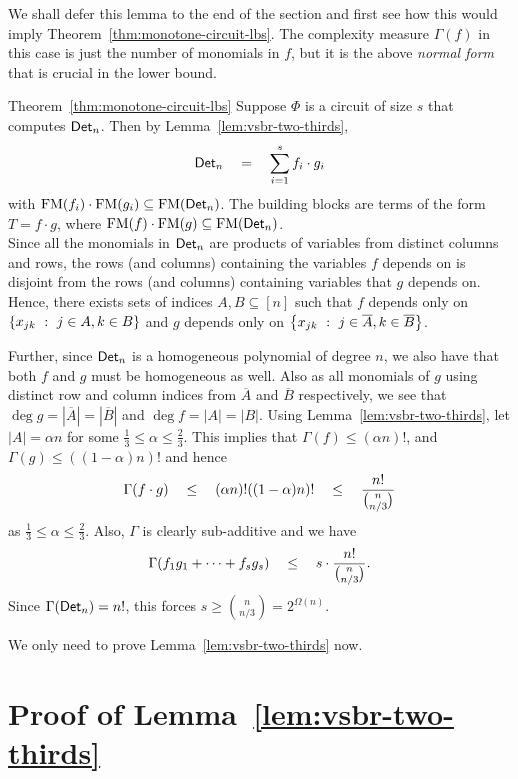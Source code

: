 \documentclass[12pt]{report}
\newcommand{\FM}{\mathrm{FM}}
\begin{document}
We shall defer this lemma to the end of the section and first see how
this would imply Theorem~\ref{thm:monotone-circuit-lbs}. The complexity measure $\Gamma(f)$ in this case is just the number of monomials in $f$, but it is the above \emph{normal form} that is crucial in the lower bound. 

\begin{proofof}{Theorem~\ref{thm:monotone-circuit-lbs}}
Suppose $\Phi$ is a circuit of size $s$ that computes $\mathsf{Det}_n$. Then by Lemma~\ref{lem:vsbr-two-thirds}, 
$$
\mathsf{Det}_n \quad=\quad \sum_{i=1}^s f_i \cdot g_i
$$
with $\FM(f_i)\cdot \FM(g_i) \subseteq \FM(\Det_n)$. The building blocks are terms of the form $T = f\cdot g$, where $\FM(f)  \cdot \FM(g) \subseteq \FM(\Det_n)$. \\

Since all the monomials in $\mathsf{Det}_n$ are products of variables from
distinct columns and rows, the rows (and columns) containing the
variables $f$ depends on is disjoint from the rows (and columns)
containing variables that $g$ depends on. Hence, there exists sets of indices $A,B
\subseteq [n]$ such that $f$ depends only on $\left\{{x_{jk}}\ : \ {j\in
  A, k\in B}\right\}$ and $g$ depends only on
$\left\{{x_{jk}}\ : \ {j\in\overline{A}, k\in
  \overline{B}}\right\}$.

Further, since $\mathsf{Det}_n$ is a homogeneous polynomial of degree $n$, we also have that both $f$ and $g$ must be homogeneous as well. Also as all monomials of $g$ using distinct row and column indices from $\overline{A}$ and $\overline{B}$ respectively, we see that $\deg g = |\overline{A}| = |\overline{B}|$ and $\deg f = |A| = |B|$. Using Lemma~\ref{lem:vsbr-two-thirds}, let $|A| = \alpha n$ for some $\frac{1}{3}\leq \alpha \leq \frac{2}{3}$. This implies that $\Gamma(f)\leq (\alpha n)!$, and $\Gamma(g)\leq ((1-\alpha)n)!$ and hence
$$\Gamma(f\cdot g) \quad \leq\quad (\alpha n)! ((1-\alpha)n)! \quad \leq \quad \frac{n!}{\binom{n}{n/3}} $$
as $\frac{1}{3}\leq \alpha \leq \frac{2}{3}$.
Also, $\Gamma$ is clearly sub-additive and we have $$\Gamma(f_1g_1 + \dots + f_s g_s) \quad \leq \quad s \cdot \frac{n!}{\binom{n}{n/3}}.$$
Since $\Gamma(\mathsf{Det}_n) = n!$, this forces $s \geq
\binom{n}{n/3} = 2^{\Omega(n)}$.
\end{proofof}

We only need to prove Lemma~\ref{lem:vsbr-two-thirds} now.

\section{Proof of Lemma~\ref{lem:vsbr-two-thirds}}
\end{document}
